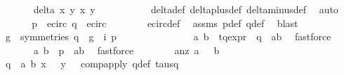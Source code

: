 \begin{isabellebody}
\ \ \ \ \ \ \isamarkupfalse%
\ {\isacartoucheopen}delta\ x{}\ y{}\ x{}\ y{}\ {\isacharequal}\ {}{\isacartoucheclose}\ \isanewline
\ \ \ \ \ \ \isamarkupfalse%
\ delta{\isacharunderscore}def\ delta{\isacharunderscore}plus{\isacharunderscore}def\ delta{\isacharunderscore}minus{\isacharunderscore}def\ \isamarkupfalse%
\ auto\isanewline
\ \ \ \ \isamarkupfalse%
\ \isamarkupfalse%
\ {\isachardoublequoteopen}p\ {\isasymin}\ e{\isacharunderscore}circ{\isachardoublequoteclose}\ {\isachardoublequoteopen}q\ {\isasymin}\ e{\isacharunderscore}circ{\isachardoublequoteclose}\isanewline
\ \ \ \ \ \ \isamarkupfalse%
\ e{\isacharunderscore}circ{\isacharunderscore}def\ \isamarkupfalse%
\ assms\ p{\isacharunderscore}def\ q{\isacharunderscore}def\ \isamarkupfalse%
\ blast{\isacharplus}\isanewline
\ \ \ \ \isamarkupfalse%
\ {\isachardoublequoteopen}{\isacharparenleft}{\isasymexists}\ g\ {\isasymin}\ symmetries{\isachardot}\ q\ {\isacharequal}\ {\isacharparenleft}g\ {\isasymcirc}\ i{\isacharparenright}\ p{\isacharparenright}{\isachardoublequoteclose}\ \isanewline
\ \ \ \ \isamarkupfalse%
\ {\isacharminus}\isanewline
\ \ \ \ \ \ \isamarkupfalse%
\ a{}\ b{}\ \ tq{\isacharunderscore}expr{\isacharcolon}\ {\isachardoublequoteopen}{\isasymtau}\ q\ {\isacharequal}\ {\isacharparenleft}a{}{\isacharcomma}b{}{\isacharparenright}{\isachardoublequoteclose}\ \isamarkupfalse%
\ fastforce\isanewline
\ \ \ \ \ \ \isamarkupfalse%
\ a{}\ b{}\ \ {\isachardoublequoteopen}p\ {\isacharequal}\ {\isacharparenleft}a{}{\isacharcomma}b{}{\isacharparenright}{\isachardoublequoteclose}\ \isamarkupfalse%
\ fastforce\isanewline
\ \ \ \ \ \ \isamarkupfalse%
\ a{}{\isacharunderscore}nz{\isacharcolon}\ {\isachardoublequoteopen}a{}\ {\isasymnoteq}\ {}{\isachardoublequoteclose}\ {\isachardoublequoteopen}b{}\ {\isasymnoteq}\ {}{\isachardoublequoteclose}\isanewline
\ \ \ \ \ \ \ \ \isamarkupfalse%
\ {\isacartoucheopen}{\isasymtau}\ q\ {\isacharequal}\ {\isacharparenleft}a{}{\isacharcomma}\ b{}{\isacharparenright}{\isacartoucheclose}\ {\isacartoucheopen}x{}\ {\isasymnoteq}\ {}{\isacartoucheclose}\ {\isacartoucheopen}y{}\ {\isasymnoteq}\ {}{\isacartoucheclose}\ comp{\isacharunderscore}apply\ q{\isacharunderscore}def\ tau{\isacharunderscore}sq\ \isamarkupfalse%

\end{isabellebody}
